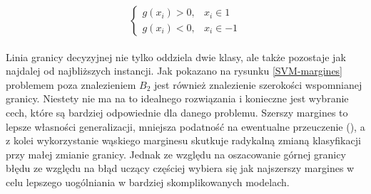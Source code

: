 \[
    \begin{cases}
            g(x_{i}) > 0,& x_{i} \in 1 \\
            g(x_{i}) < 0,& x_{i} \in -1
    \end{cases}
\]
\\

Linia granicy decyzyjnej nie tylko oddziela dwie klasy, ale także pozostaje jak najdalej od najbliższych instancji. Jak pokazano na rysunku \ref{SVM-margines} problemem poza znalezieniem $B_{2}$ jest również znalezienie szerokości wspomnianej granicy. Niestety nie ma na to idealnego rozwiązania i konieczne jest wybranie cech, które są bardziej odpowiednie dla danego problemu. Szerszy margines to lepsze własności generalizacji, mniejsza podatność na
ewentualne przeuczenie (), a z kolei wykorzystanie wąskiego marginesu skutkuje radykalną zmianą klasyfikacji przy małej zmianie granicy. Jednak ze względu na oszacowanie górnej granicy błędu ze względu na błąd uczący częściej wybiera się jak najszerszy margines w celu lepszego uogólniania w bardziej skomplikowanych modelach.

